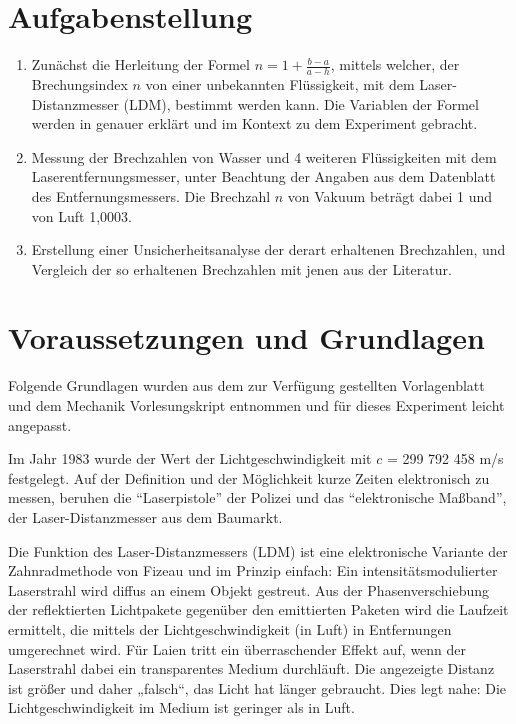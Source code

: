 \documentclass[11pt,ngerman]{scrartcl}
\begin{document}

\tableofcontents
\newpage
\section{Aufgabenstellung}
\label{sec:aufgabenstellung} 

\begin{enumerate}
    \item Zunächst die Herleitung der Formel $n = 1 + \frac{b-a}{a-h}$, mittels
        welcher, der Brechungsindex $n$ von einer unbekannten Flüssigkeit, mit
        dem Laser-Distanzmesser (LDM), bestimmt werden kann.  Die Variablen der
        Formel werden in  genauer
        erklärt und im Kontext zu dem Experiment gebracht.  
    \item Messung der Brechzahlen von Wasser
        und 4 weiteren Flüssigkeiten mit dem Laserentfernungsmesser, unter Beachtung der Angaben aus dem
        Datenblatt des Entfernungsmessers. Die
        Brechzahl $n$ von Vakuum beträgt dabei 1 und von Luft 1,0003.  
    \item Erstellung einer Unsicherheitsanalyse der derart
        erhaltenen Brechzahlen, und Vergleich der so erhaltenen Brechzahlen
        mit jenen aus der Literatur.
\end{enumerate}

\section{Voraussetzungen und Grundlagen} \label{sec:voraussetzungen_grundlagen}
Folgende Grundlagen wurden aus dem zur Verfügung gestellten Vorlagenblatt
\cite{vorlageentfernung2021} und dem Mechanik Vorlesungskript \cite{Knoll2020}
entnommen und für dieses Experiment leicht angepasst.

Im Jahr 1983 wurde der Wert der Lichtgeschwindigkeit mit $c$ = 299 792 458 m/s
festgelegt. Auf der Definition und der Möglichkeit kurze Zeiten elektronisch zu
messen, beruhen die ``Laserpistole'' der Polizei und das ``elektronische Maßband'',
der Laser-Distanzmesser aus dem Baumarkt.

Die Funktion des Laser-Distanzmessers (LDM) ist eine elektronische Variante der
Zahnradmethode von Fizeau und im Prinzip einfach: Ein intensitätsmodulierter
Laserstrahl wird diffus an einem Objekt gestreut. Aus der Phasenverschiebung
der reflektierten Lichtpakete gegenüber den emittierten Paketen wird die
Laufzeit ermittelt, die mittels der Lichtgeschwindigkeit (in Luft) in
Entfernungen umgerechnet wird. Für Laien tritt ein überraschender Effekt auf,
wenn der Laserstrahl dabei ein transparentes Medium durchläuft. Die angezeigte
Distanz ist größer und daher „falsch“, das Licht hat länger gebraucht. Dies
legt nahe: Die Lichtgeschwindigkeit im Medium ist geringer als in Luft.
\end{document}
